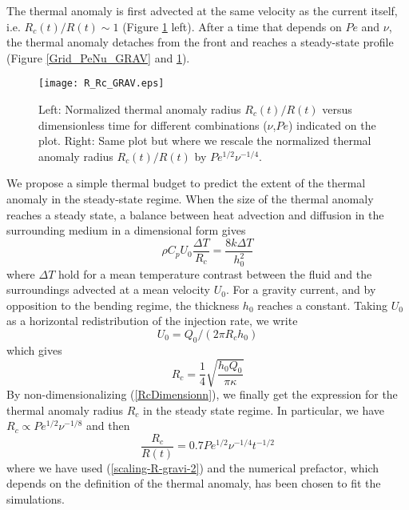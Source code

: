 The thermal  anomaly is first advected  at the same velocity as the
current  itself, i.e.   $R_c(t)/R(t) \sim  1$ (Figure  \ref{R_Rc_GRAV}
left).   After a  time that  depends on  $Pe$ and  $\nu$, the  thermal
anomaly detaches  from the  front and  reaches a  steady-state profile
(Figure \ref{Grid_PeNu_GRAV} and \ref{R_Rc_GRAV}).
\begin{figure}
  \begin{center}
    \graphicspath{ {/Users/thorey/Documents/These/Projet/Refroidissement/Skin_Model/Figure/JFM_V13/} }
    \texttt{[image: R\_Rc\_GRAV.eps]}
    \caption{Left:  Normalized  thermal anomaly  radius  $R_c(t)/R(t)$
      versus   dimensionless    time   for    different   combinations
      ($\nu$,$Pe$) indicated on the plot.   Right: Same plot but where
      we rescale  the normalized thermal anomaly  radius $R_c(t)/R(t)$
      by $Pe^{1/2}\nu^{-1/4}$.}
    \label{R_Rc_GRAV}
  \end{center}
\end{figure}

We  propose a  simple  thermal budget  to predict  the  extent of  the
thermal  anomaly in  the steady-state  regime.  When the  size of  the
thermal  anomaly  reaches  a  steady state,  a  balance  between  heat
advection and  diffusion in  the surrounding  medium in  a dimensional
form gives
\begin{equation}
  \rho C_p U_0 \frac{\Delta T}{R_c} = \frac{8 k \Delta T}{h_0^2}
\end{equation}
where  $\Delta T$  hold for  a mean  temperature contrast  between the
fluid and  the surroundings  advected at  a mean  velocity $U_0$.  For a
gravity  current,  and  by  opposition  to  the  bending  regime,  the
thickness  $h_0$  reaches  a  constant. Taking  $U_0$  as  a  horizontal
redistribution of the injection rate, we write
\begin{equation}
  U_0=Q_0/(2\pi R_c h_0)
\end{equation}
which gives
\begin{equation}
  R_c=\frac{1}{4}\sqrt{\frac{h_0 Q_0}{\pi \kappa}}
  \label{RcDimensionn}
\end{equation}
By  non-dimensionalizing  (\ref{RcDimensionn}),  we  finally  get  the
expression for  the thermal anomaly  radius $R_c$ in the  steady state
regime. In  particular, we  have $R_c \propto  Pe^{1/2}\nu^{-1/8}$ and
then
\begin{equation}
  \frac{R_c}{R(t)} = 0.7Pe^{1/2}\nu^{-1/4}t^{-1/2}
  \label{Scaling-Rc-Gravy}
\end{equation}
where  we  have  used (\ref{scaling-R-gravi-2})  and  the  numerical
prefactor, which depends on the definition of the thermal anomaly, has
been chosen to fit the simulations.

